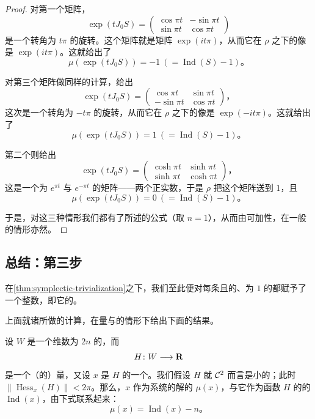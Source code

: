 \begin{proof}
对第一个矩阵，
\[
\exp(tJ_0S)=\begin{pmatrix}\cos\pi t&-\sin\pi t\\ \sin\pi t&\cos\pi t\end{pmatrix}
\]
是一个转角为 $t\pi$ 的旋转。这个矩阵就是\trUnitary{}矩阵 $\exp(it\pi)$，从而它在 $\rho$ 之下的像是 $\exp(it\pi)$。这就给出了\trMaslovIndex
\[
\mu(\exp(tJ_0S))=-1\ (= \operatorname{Ind}(S)-1)\text{。}
\]

对第三个矩阵做同样的计算，给出
\[
\exp(tJ_0S)=\begin{pmatrix}\cos\pi t&\sin\pi t\\ -\sin\pi t&\cos\pi t\end{pmatrix}\text{，}
\]
这次是一个转角为 $-t\pi$ 的旋转，从而它在 $\rho$ 之下的像是 $\exp(-it\pi)$。这就给出了\trMaslovIndex
\[
\mu(\exp(tJ_0S))=1\ (= \operatorname{Ind}(S)-1)\text{。}
\]

第二个\trSymmetricMatrix{}则给出
\[
\exp(tJ_0S)=\begin{pmatrix}\cosh\pi t&\sinh\pi t\\ \sinh\pi t&\cosh\pi t\end{pmatrix}\text{，}
\]
这是一个\trEigenvalue{}为 $e^{\pi t}$ 与 $e^{-\pi t}$ 的矩阵——两个正实数，于是 $\rho$ 把这个矩阵送到 $1$，且
\[
\mu(\exp(tJ_0S))=0\ (= \operatorname{Ind}(S)-1)\text{。}
\]

于是，对这三种情形我们都有了所述的公式（取 $n=1$），从而由可加性，在一般的情形亦然。
\end{proof}

\subsection{总结：第三步}
\label{subsec:summary-third-step}

在\cref{thm:symplectic-trivialization}之下，我们至此便对每条\trNondegenerate{}且\trContractible{}的、\trPeriodic{}为 $1$ 的\trTrajectory{}都赋予了一个整数，即它的\emph{\trMaslovIndex}。

上面就诸\trSymmetricMatrix{}所做的\trMaslovIndex{}计算，在\trAutonomous{}\trHamiltonian{}量与\trStationary\trTrajectory{}的情形下给出下面的结果。

\begin{corollary}\label{thm:maslov-index-autonomous}
设 $W$ 是一个维数为 $2n$ 的\trSymplectic\trManifold，而
\[
H\colon W\longrightarrow\mathbf{R}
\]
是一个（\trAutonomous{}的）\trHamiltonian{}量，又设 $x$ 是 $H$ 的一个\trCriticalPoint。我们假设 $H$ 就 $\mathcal{C}^2$ \trTopology{}而言是小的；此时 $\|\operatorname{Hess}_x(H)\|<2\pi$。那么，$x$ 作为\trHamiltonian{}系统的\trPeriodic{}解的\trMaslovIndex{} $\mu(x)$，与它作为函数 $H$ 的\trCriticalPoint{}的\trIndex{} $\operatorname{Ind}(x)$，由下式联系起来：
\[
\mu(x)=\operatorname{Ind}(x)-n\text{。}
\]
\noqed
\end{corollary}

